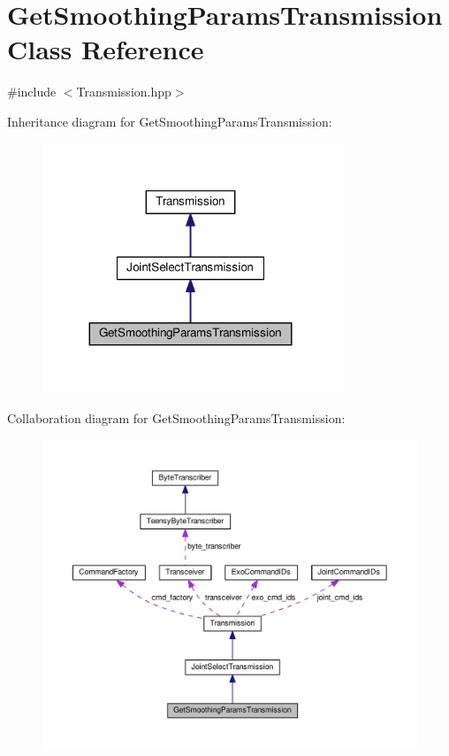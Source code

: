 \hypertarget{classGetSmoothingParamsTransmission}{}\section{Get\+Smoothing\+Params\+Transmission Class Reference}
\label{classGetSmoothingParamsTransmission}


{\ttfamily \#include $<$Transmission.\+hpp$>$}



Inheritance diagram for Get\+Smoothing\+Params\+Transmission\+:\nopagebreak
\begin{figure}[H]
\begin{center}
\leavevmode
\includegraphics[width=251pt]{classGetSmoothingParamsTransmission__inherit__graph}
\end{center}
\end{figure}


Collaboration diagram for Get\+Smoothing\+Params\+Transmission\+:
\nopagebreak
\begin{figure}[H]
\begin{center}
\leavevmode
\includegraphics[width=350pt]{classGetSmoothingParamsTransmission__coll__graph}
\end{center}
\end{figure}
